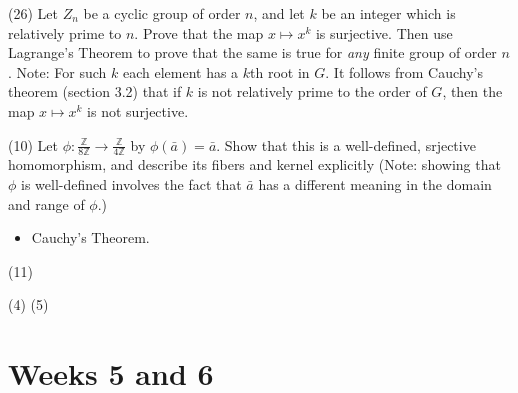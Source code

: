 \documentclass[1    0pt, answers]{exam} \renewcommand{\baselinestretch}{1.05}
\theoremstyle{plain}
\theoremstyle{definition}
\begin{document}
\begin{questions}
\question (26) Let $Z_n$ be a cyclic group of order $n$, and let $k$ be an integer which is relatively prime to $n$. Prove that the map $x \mapsto x^k$ is surjective. Then use Lagrange's Theorem to prove that the same is true for \emph{any} finite group of order $n$. Note: For such $k$ each element has a $k$th root in $G$. It follows from Cauchy's theorem (section 3.2) that if $k$ is not relatively prime to the order of $G$, then the map $x \mapsto x^k$ is not surjective.


\question (10) Let $\phi : \frac{\mathbb{Z}}{8 \mathbb{Z}} \to \frac{\mathbb{Z}}{4 \mathbb{Z}}$ by $\phi(\bar{a}) = \bar{a}$. Show that this is a well-defined, srjective homomorphism, and describe its fibers and kernel explicitly (Note: showing that $\phi$ is well-defined involves the fact that $\bar{a}$ has a different meaning in the domain and range of $\phi$.)

\begin{itemize}
\item Cauchy's Theorem.
\end{itemize}

\question (11)

\question (4)
\question (5)


\end{questions}

\section{Weeks 5 and 6}
\end{document}
